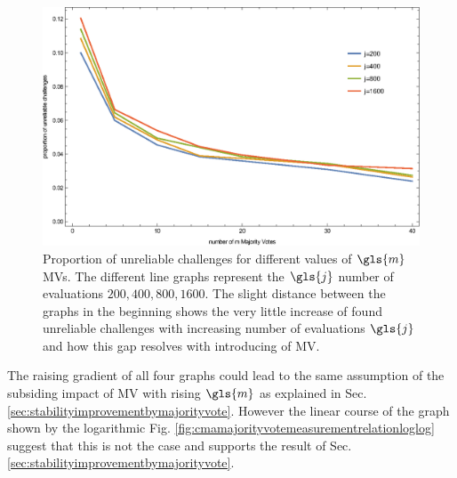 \begin{figure}[ht]
\includegraphics[width=1.00\textwidth]{images/mv-measurements-unstableChallenges.eps}
\caption[Proportion of unreliable challenges]{Proportion of unreliable challenges for different values of $\gls{m}$ \acp{MV}. The different line graphs represent the $\gls{j}$ number of evaluations $200, 400, 800, 1600$. The slight distance between the graphs in the beginning shows the very little increase of found unreliable challenges with increasing number of evaluations $\gls{j}$ and how this gap resolves with introducing of \ac{MV}.}
\label{fig:cmamajorityvotemeasurementrelation}
\end{figure}

The raising gradient of all four graphs could lead to the same assumption of the subsiding impact of \ac{MV} with rising $\gls{m}$ as explained in Sec. \ref{sec:stabilityimprovementbymajorityvote}.
However the linear course of the graph shown by the logarithmic Fig. \ref{fig:cmamajorityvotemeasurementrelationloglog} suggest that this is not the case and supports the result of Sec. \ref{sec:stabilityimprovementbymajorityvote}.

